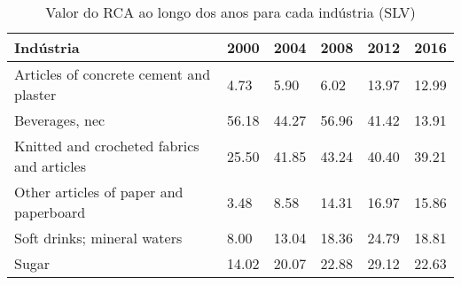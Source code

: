 \begin{table}
\centering
\caption{Valor do RCA ao longo dos anos para cada indústria (SLV)}
\label{tab:ex3-tempo-SLV}
\begin{tabular}{p{6cm}p{1.5cm}p{1.5cm}p{1.5cm}p{1.5cm}p{1.5cm}}
\toprule
                                 Indústria &  2000 &  2004 &  2008 &  2012 &  2016 \\
\midrule
   Articles of concrete cement and plaster &  4.73 &  5.90 &  6.02 & 13.97 & 12.99 \\
                            Beverages, nec & 56.18 & 44.27 & 56.96 & 41.42 & 13.91 \\
Knitted and crocheted fabrics and articles & 25.50 & 41.85 & 43.24 & 40.40 & 39.21 \\
    Other articles of paper and paperboard &  3.48 &  8.58 & 14.31 & 16.97 & 15.86 \\
               Soft drinks; mineral waters &  8.00 & 13.04 & 18.36 & 24.79 & 18.81 \\
                                     Sugar & 14.02 & 20.07 & 22.88 & 29.12 & 22.63 \\
\bottomrule
\end{tabular}
\end{table}
